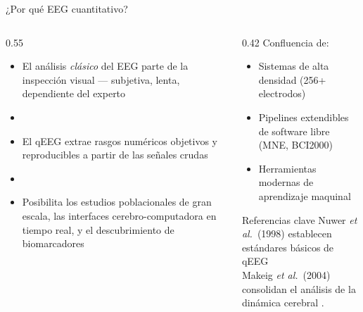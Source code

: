 

\begin{frame}{¿Por qué EEG cuantitativo?}
  \begin{columns}[T]
    \begin{column}{0.55\textwidth}
      \begin{itemize}
        \item El análisis \emph{clásico} del EEG parte de la \alert{inspección visual} — subjetiva, lenta, dependiente del experto
        \item[]
        \item El qEEG extrae \alert{rasgos numéricos objetivos y reproducibles} a partir de las señales crudas
        \item[]
        \item Posibilita los estudios poblacionales de gran escala, las interfaces cerebro-computadora en tiempo real, y el descubrimiento de biomarcadores
      \end{itemize}
    \end{column}
    \begin{column}{0.42\textwidth}
    	Confluencia de:
			\begin{itemize}
				\item Sistemas de alta densidad (256+ electrodos)
				\item Pipelines extendibles de software libre (MNE, BCI2000)
				\item Herramientas modernas de aprendizaje maquinal
			\end{itemize}
      \vspace{0.5em}
      \begin{block}{Referencias clave}
        \small
        Nuwer \textit{et al.}\ (1998) establecen estándares básicos de qEEG \cite{Nuwer1999} \\
        \vspace{5pt}
        Makeig \textit{et al.}\ (2004) consolidan el análisis de la dinámica cerebral \cite{Makeig2004}.
      \end{block}
    \end{column}
  \end{columns}
\end{frame}
